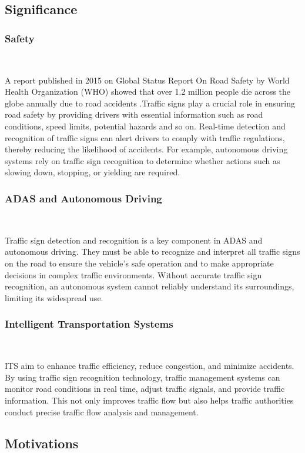\documentclass[letterpaper, 10 pt, conference]{ieeeconf}
\begin{document}
\subsection{Significance}

\subsubsection{Safety}\

A report published in 2015 on Global Status Report On Road Safety by World Health Organization (WHO) showed that over 1.2 million people die across the globe annually due to road accidents \cite{WHO2015}.Traffic signs play a crucial role in ensuring road safety by providing drivers with essential information such as road conditions, speed limits, potential hazards and so on. Real-time detection and recognition of traffic signs can alert drivers to comply with traffic regulations, thereby reducing the likelihood of accidents. For example, autonomous driving systems rely on traffic sign recognition to determine whether actions such as slowing down, stopping, or yielding are required.

\subsubsection{ADAS and Autonomous Driving}\

Traffic sign detection and recognition is a key component in ADAS and autonomous driving. They must be able to recognize and interpret all traffic signs on the road to ensure the vehicle's safe operation and to make appropriate decisions in complex traffic environments. Without accurate traffic sign recognition, an autonomous system cannot reliably understand its surroundings, limiting its widespread use.

\subsubsection{Intelligent Transportation Systems}\

ITS aim to enhance traffic efficiency, reduce congestion, and minimize accidents. By using traffic sign recognition technology, traffic management systems can monitor road conditions in real time, adjust traffic signals, and provide traffic information. This not only improves traffic flow but also helps traffic authorities conduct precise traffic flow analysis and management.

\subsection{Motivations}
\end{document}
